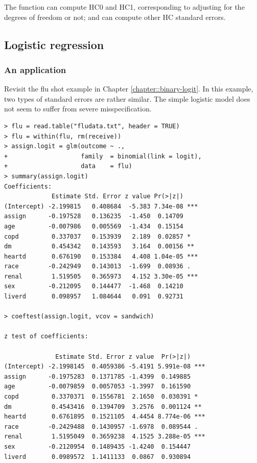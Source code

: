 The  function can compute HC0 and HC1, corresponding to adjusting for the degrees of freedom or not;  and  can compute other HC standard errors. 


\subsection{Logistic regression}

\subsubsection{An application}
Revisit the flu shot example in Chapter \ref{chapter::binary-logit}. In this example, two types of standard errors are rather similar. The simple logistic model does not seem to suffer from severe misspecification. 

\begin{lstlisting}
> flu = read.table("fludata.txt", header = TRUE)
> flu = within(flu, rm(receive))
> assign.logit = glm(outcome ~ ., 
+                    family  = binomial(link = logit), 
+                    data    = flu)
> summary(assign.logit)
Coefficients:
             Estimate Std. Error z value Pr(>|z|)    
(Intercept) -2.199815   0.408684  -5.383 7.34e-08 ***
assign      -0.197528   0.136235  -1.450  0.14709    
age         -0.007986   0.005569  -1.434  0.15154    
copd         0.337037   0.153939   2.189  0.02857 *  
dm           0.454342   0.143593   3.164  0.00156 ** 
heartd       0.676190   0.153384   4.408 1.04e-05 ***
race        -0.242949   0.143013  -1.699  0.08936 .  
renal        1.519505   0.365973   4.152 3.30e-05 ***
sex         -0.212095   0.144477  -1.468  0.14210    
liverd       0.098957   1.084644   0.091  0.92731    

> coeftest(assign.logit, vcov = sandwich)

z test of coefficients:

              Estimate Std. Error z value  Pr(>|z|)    
(Intercept) -2.1998145  0.4059386 -5.4191 5.991e-08 ***
assign      -0.1975283  0.1371785 -1.4399  0.149885    
age         -0.0079859  0.0057053 -1.3997  0.161590    
copd         0.3370371  0.1556781  2.1650  0.030391 *  
dm           0.4543416  0.1394709  3.2576  0.001124 ** 
heartd       0.6761895  0.1521105  4.4454 8.774e-06 ***
race        -0.2429488  0.1430957 -1.6978  0.089544 .  
renal        1.5195049  0.3659238  4.1525 3.288e-05 ***
sex         -0.2120954  0.1489435 -1.4240  0.154447    
liverd       0.0989572  1.1411133  0.0867  0.930894    
\end{lstlisting} 



